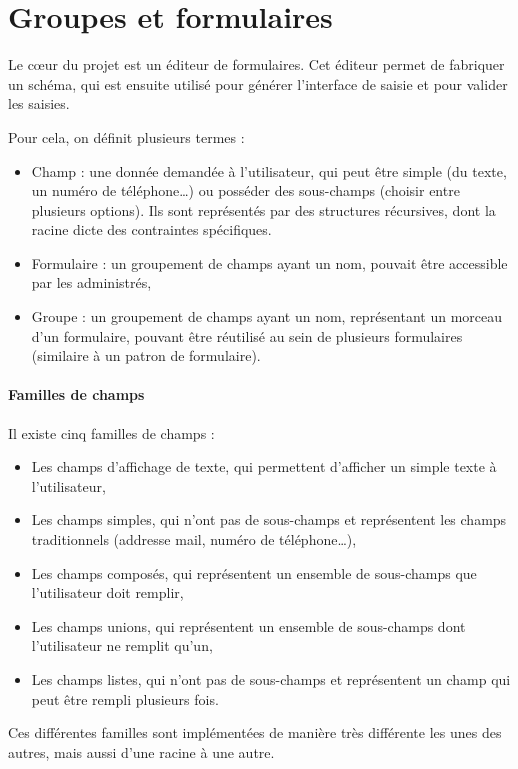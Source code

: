 \section{Groupes et formulaires}\label{sec:groupes-et-formulaires}

Le cœur du projet est un éditeur de formulaires.
Cet éditeur permet de fabriquer un schéma, qui est ensuite utilisé pour générer l'interface de saisie et pour valider les saisies.

Pour cela, on définit plusieurs termes :
\begin{itemize}
	\item Champ : une donnée demandée à l'utilisateur, qui peut être simple (du texte, un numéro de téléphone…) ou posséder des sous-champs (choisir entre plusieurs options).
	Ils sont représentés par des structures récursives, dont la racine dicte des contraintes spécifiques.
	\item Formulaire : un groupement de champs ayant un nom, pouvait être accessible par les administrés,
	\item Groupe : un groupement de champs ayant un nom, représentant un morceau d'un formulaire, pouvant être réutilisé au sein de plusieurs formulaires (similaire à un patron de formulaire).
\end{itemize}

\paragraph{Familles de champs}
Il existe cinq familles de champs :
\begin{itemize}
	\item Les champs d'affichage de texte, qui permettent d'afficher un simple texte à l'utilisateur,
	\item Les champs simples, qui n'ont pas de sous-champs et représentent les champs traditionnels (addresse mail, numéro de téléphone…),
	\item Les champs composés, qui représentent un ensemble de sous-champs que l'utilisateur doit remplir,
	\item Les champs unions, qui représentent un ensemble de sous-champs dont l'utilisateur ne remplit qu'un,
	\item Les champs listes, qui n'ont pas de sous-champs et représentent un champ qui peut être rempli plusieurs fois.
\end{itemize}
Ces différentes familles sont implémentées de manière très différente les unes des autres, mais aussi d'une racine à une autre.

